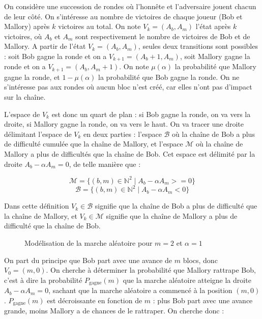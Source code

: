 	On considère une succession de rondes où l'honnête et l'adversaire jouent
	chacun de leur côté. On s'intéresse au nombre de victoires de chaque joueur
	(Bob et Mallory) après $k$ victoires au total. On note $V_k = (A_b, A_m)$
	l'état après $k$ victoires, où $A_b$ et $A_m$ sont respectivement le nombre de
	victoires de Bob et de Mallory. A partir de l'état $V_k = (A_b, A_m)$, seules
	deux transitions sont possibles : soit Bob gagne la ronde et on a $V_{k+1} =
	(A_b+1, A_m)$, soit Mallory gagne la ronde et on a $V_{k+1} = (A_b, A_m+1)$.
	On note $\mu(\alpha)$ la probabilité que Mallory gagne la ronde, et
	$1-\mu(\alpha)$ la probabilité que Bob gagne la ronde. On ne s'intéresse pas
	aux rondes où aucun bloc n'est créé, car elles n'ont pas d'impact sur la
	chaîne.
	
	L'espace de $V_k$ est donc un quart de plan : si Bob gagne la ronde, on va
	vers la droite, si Mallory gagne la ronde, on va vers le haut. On va tracer
	une droite délimitant l'espace de $V_k$ en deux parties : l'espace
	$\mathcal{B}$ où la chaîne de Bob a plus de difficulté cumulée que la chaîne
	de Mallory, et l'espace $\mathcal{M}$ où la chaîne de Mallory a plus de
	difficultés que la chaîne de Bob. Cet espace est délimité par la droite $A_b -
	\alpha A_m = 0$, de telle manière que :

	\begin{equation}
			\mathcal{M} = \{ (b,m) \in \mathbb{N}^2 \mid A_b - \alpha A_m >= 0 \}
	\end{equation}
	\begin{equation}
			\mathcal{B} = \{ (b,m) \in \mathbb{N}^2 \mid A_b - \alpha A_m < 0 \}
	\end{equation}


	Dans cette définition $V_k \in \mathcal{B}$ signifie que la chaîne de Bob a
	plus de difficulté que la chaîne de Mallory, et $V_k \in \mathcal{M}$
	signifie que la chaîne de Mallory a plus de difficulté que la chaîne de Bob.

	\vspace{0.4cm}
	\begin{figure}[h]
			\centering
			
			\caption{Modélisation de la marche aléatoire pour $m = 2$ et $\alpha = 1$}
			\label{fig:walk}
	\end{figure}

	On part du principe que Bob part avec une avance de $m$ blocs, donc $V_0 = (m,
	0)$. On cherche à déterminer la probabilité que Mallory rattrape Bob, c'est à
	dire la probabilité $P_{\text{gagne}}(m)$ que la marche aléatoire atteigne la
	droite $A_b - \alpha A_m = 0$, sachant que la marche aléatoire a commencé à la
	position $(m, 0)$. $P_{\text{gagne}}(m)$ est décroissante en fonction de $m$ :
	plus Bob part avec une avance grande, moins Mallory a de chances de le
	rattraper. On cherche donc :
	
